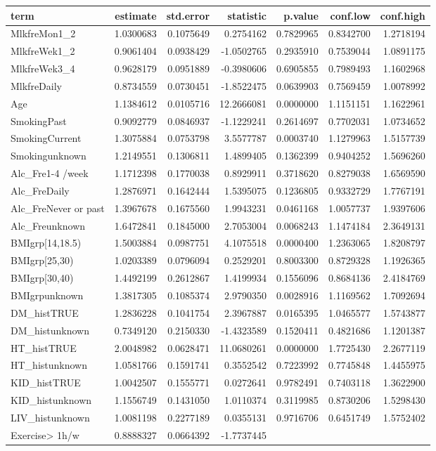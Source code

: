 \documentclass[]{article}
\begin{document}
\begin{longtable}[]{@{}lrrrrrr@{}}
\toprule
term & estimate & std.error & statistic & p.value & conf.low &
conf.high\tabularnewline
\midrule
\endhead
MlkfreMon1\_2 & 1.0300683 & 0.1075649 & 0.2754162 & 0.7829965 &
0.8342700 & 1.2718194\tabularnewline
MlkfreWek1\_2 & 0.9061404 & 0.0938429 & -1.0502765 & 0.2935910 &
0.7539044 & 1.0891175\tabularnewline
MlkfreWek3\_4 & 0.9628179 & 0.0951889 & -0.3980606 & 0.6905855 &
0.7989493 & 1.1602968\tabularnewline
MlkfreDaily & 0.8734559 & 0.0730451 & -1.8522475 & 0.0639903 & 0.7569459
& 1.0078992\tabularnewline
Age & 1.1384612 & 0.0105716 & 12.2666081 & 0.0000000 & 1.1151151 &
1.1622961\tabularnewline
SmokingPast & 0.9092779 & 0.0846937 & -1.1229241 & 0.2614697 & 0.7702031
& 1.0734652\tabularnewline
SmokingCurrent & 1.3075884 & 0.0753798 & 3.5577787 & 0.0003740 &
1.1279963 & 1.5157739\tabularnewline
Smokingunknown & 1.2149551 & 0.1306811 & 1.4899405 & 0.1362399 &
0.9404252 & 1.5696260\tabularnewline
Alc\_Fre1-4 /week & 1.1712398 & 0.1770038 & 0.8929911 & 0.3718620 &
0.8279038 & 1.6569590\tabularnewline
Alc\_FreDaily & 1.2876971 & 0.1642444 & 1.5395075 & 0.1236805 &
0.9332729 & 1.7767191\tabularnewline
Alc\_FreNever or past & 1.3967678 & 0.1675560 & 1.9943231 & 0.0461168 &
1.0057737 & 1.9397606\tabularnewline
Alc\_Freunknown & 1.6472841 & 0.1845000 & 2.7053004 & 0.0068243 &
1.1474184 & 2.3649131\tabularnewline
BMIgrp{[}14,18.5) & 1.5003884 & 0.0987751 & 4.1075518 & 0.0000400 &
1.2363065 & 1.8208797\tabularnewline
BMIgrp{[}25,30) & 1.0203389 & 0.0796094 & 0.2529201 & 0.8003300 &
0.8729328 & 1.1926365\tabularnewline
BMIgrp{[}30,40) & 1.4492199 & 0.2612867 & 1.4199934 & 0.1556096 &
0.8684136 & 2.4184769\tabularnewline
BMIgrpunknown & 1.3817305 & 0.1085374 & 2.9790350 & 0.0028916 &
1.1169562 & 1.7092694\tabularnewline
DM\_histTRUE & 1.2836228 & 0.1041754 & 2.3967887 & 0.0165395 & 1.0465577
& 1.5743877\tabularnewline
DM\_histunknown & 0.7349120 & 0.2150330 & -1.4323589 & 0.1520411 &
0.4821686 & 1.1201387\tabularnewline
HT\_histTRUE & 2.0048982 & 0.0628471 & 11.0680261 & 0.0000000 &
1.7725430 & 2.2677119\tabularnewline
HT\_histunknown & 1.0581766 & 0.1591741 & 0.3552542 & 0.7223992 &
0.7745848 & 1.4455975\tabularnewline
KID\_histTRUE & 1.0042507 & 0.1555771 & 0.0272641 & 0.9782491 &
0.7403118 & 1.3622900\tabularnewline
KID\_histunknown & 1.1556749 & 0.1431050 & 1.0110374 & 0.3119985 &
0.8730206 & 1.5298430\tabularnewline
LIV\_histunknown & 1.0081198 & 0.2277189 & 0.0355131 & 0.9716706 &
0.6451749 & 1.5752402\tabularnewline
Exercise\textgreater{} 1h/w & 0.8888327 & 0.0664392 & -1.7737445 &

\end{longtable}
\end{document}
